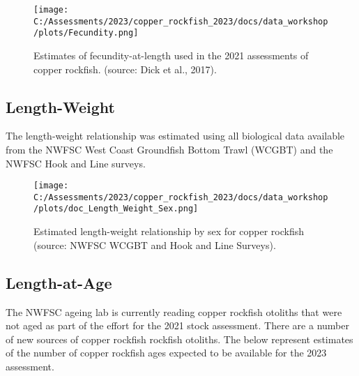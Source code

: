 \documentclass[
]{article}
\begin{document}
\begin{figure}
\centering
\texttt{[image: C:/Assessments/2023/copper\_rockfish\_2023/docs/data\_workshop/plots/Fecundity.png]}
\caption{Estimates of fecundity-at-length used in the 2021 assessments
of copper rockfish. (source: Dick et al.,
2017).\label{fig:fecundity-2021}}
\end{figure}

\hypertarget{length-weight}{%
\subsection{Length-Weight}\label{length-weight}}

The length-weight relationship was estimated using all biological data
available from the NWFSC West Coast Groundfish Bottom Trawl (WCGBT) and
the NWFSC Hook and Line surveys.

\begin{figure}
\centering
\texttt{[image: C:/Assessments/2023/copper\_rockfish\_2023/docs/data\_workshop/plots/doc\_Length\_Weight\_Sex.png]}
\caption{Estimated length-weight relationship by sex for copper rockfish
(source: NWFSC WCGBT and Hook and Line
Surveys).\label{fig:weight-length}}
\end{figure}

\hypertarget{length-at-age}{%
\subsection{Length-at-Age}\label{length-at-age}}

The NWFSC ageing lab is currently reading copper rockfish otoliths that
were not aged as part of the effort for the 2021 stock assessment. There
are a number of new sources of copper rockfish rockfish otoliths. The
below represent estimates of the number of copper rockfish ages expected
to be available for the 2023 assessment.
\end{document}
